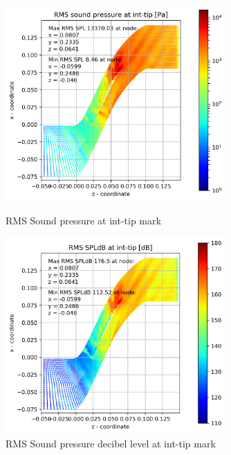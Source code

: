\begin{figure}[ht]
  \centering
  \includegraphics[width=0.75\textwidth]{Figures/int-tip-rms-spl.png} 
  \caption{RMS Sound pressure at int-tip mark} \label{int-tip-rms-spl}
  
  \vspace*{\floatsep}%

  \includegraphics[width=0.75\textwidth]{Figures/int-tip-rms-spldb.png} 
  \caption{RMS Sound pressure decibel level at int-tip mark} \label{int-tip-rms-spldb}
\end{figure}
